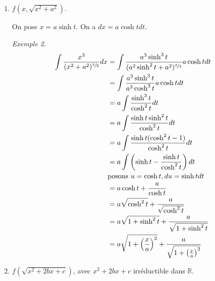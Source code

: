 \documentclass{report}
\newcommand*{\reels}{\mathbb{R}}
\newcommand*{\complexes}{\mathbb{C}}
\theoremstyle{definition}
\theoremstyle{remark}
\newtheorem*{exem}{Exemple}
\newtheorem*{rema}{Remarque}
\newtheorem*{rapp}{Rappel}
\begin{document}
\begin{enumerate}
\begin{rapp}
			Formellement,
			\begin{align*}
				\begin{split}
					\sinh x&= \dfrac{e^z-e^{-z}}{2}
				\end{split}
				&
				\begin{split}
					\cosh x&= \dfrac{e^z+e^{-z}}{2}
				\end{split}
			\end{align*}
			avec $z \in \complexes$.
		\end{rapp}

		$f\left( x,\sqrt{x^2-a^2} \right)$.

		On pose $x = a \cosh t$. On a $dx = a \sinh t dt$.
		\begin{exem}
			\begin{align*}
				\int \dfrac{x^2}{\sqrt{x^2-a^2}} dx &= \int \dfrac{a^2\cosh^2t}{\sqrt{a^2\cosh^2t-a^2}}a\sinh tdt\\
				&= \int \dfrac{a^2\cosh^2t}{a\sinh t}a\sinh tdt\\
				&= \int a^2\cosh^2tdt\\
				&= \int a^2 \dfrac{a+\cosh 2t}{2}dt\\
				&= \dfrac{a^2t}{2} + \dfrac{a^2}{2}\dfrac{\sinh2t}{2}
			\end{align*}
		\end{exem}
		\begin{rema}
			$\mathrm{arccosh}t = \ln\left( t+\sqrt{t^2-1} \right)$, $\mathrm{arcsinh}t = \ln\left( t+\sqrt{1+t^2} \right)$.
		\end{rema}
		\item $f\left( x, \sqrt{x^2+a^2} \right)$.

		On pose $x = a\sinh t$. On a $dx = a\cosh t dt$.
		\begin{exem}
			\begin{align*}
				\int \dfrac{x^3}{(x^2+a^2)^{\sfrac{3}{2}}} dx &= \int \dfrac{a^3\sinh^3t}{(a^2\sinh^2t+a^2)^{\sfrac{3}{2}}} a\cosh t dt\\
				&= \int \dfrac{a^3\sinh^3t}{a^3\cosh^3t} a\cosh t dt\\
				&= a\int \dfrac{\sinh^3t}{\cosh^2t} dt\\
				&= a\int \dfrac{\sinh t \sinh^2t}{\cosh^2t} dt\\
				&= a\int \dfrac{\sinh t (\cosh^2t-1)}{\cosh^2t} dt\\
				&= a\int \left( \sinh t - \dfrac{\sinh t}{\cosh^2t} \right) dt\\
				&\text{posons }u=\cosh t, du=\sinh t dt\\
				&= a\cosh t + \dfrac{a}{\cosh t}\\
				&= a\sqrt{\cosh^2t} + \dfrac{a}{\sqrt{\cosh^2t}}\\
				&= a\sqrt{1+\sinh^2t} + \dfrac{a}{\sqrt{1+\sinh^2t}}\\
				&= a\sqrt{1+ \left( \frac{x}{a} \right) ^2} + \dfrac{a}{\sqrt{1+ \left( \frac{x}{a} \right) ^2}}
			\end{align*}
		\end{exem}
		\item $f\left( \sqrt{x^2+2bx+c} \right)$, avec $x^2+2bx+c$ irr\'eductible dans $\reels$.


\end{enumerate}
\end{document}
